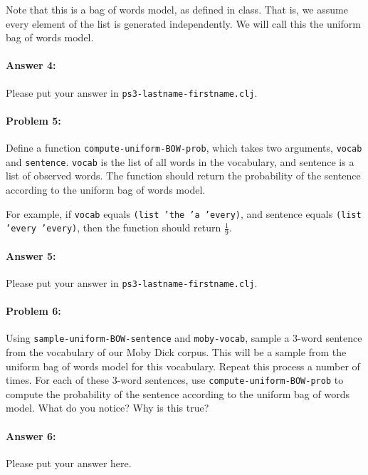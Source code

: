 \documentclass[10pt]{article}
\newcommand{\PSnum}{3}
\begin{document}
Note that this is a bag of words model, as defined in class. That is,
we assume every element of the list is generated independently. We
will call this the uniform bag of words model.

\paragraph{Answer 4:} Please put your answer in
\texttt{ps\PSnum-lastname-firstname.clj}.

\noindent\hrulefill %

\paragraph{Problem 5:}

Define a function \texttt{compute-uniform-BOW-prob}, which takes two
arguments, \texttt{vocab} and \texttt{sentence}. \texttt{vocab} is the
list of all words in the vocabulary, and sentence is a list of
observed words. The function should return the probability of the
sentence according to the uniform bag of words model.

For example, if \texttt{vocab} equals \texttt{(list 'the 'a 'every)},
and sentence equals \texttt{(list 'every 'every)}, then the function
should return $\frac{1}{9}$.

\paragraph{Answer 5:} Please put your answer in
\texttt{ps\PSnum-lastname-firstname.clj}.

\noindent\hrulefill %

\paragraph{Problem 6:}

Using \texttt{sample-uniform-BOW-sentence} and \texttt{moby-vocab},
sample a 3-word sentence from the vocabulary of our Moby Dick
corpus. This will be a sample from the uniform bag of words model for
this vocabulary. Repeat this process a number of times. For each of
these 3-word sentences, use \texttt{compute-uniform-BOW-prob} to
compute the probability of the sentence according to the uniform bag
of words model. What do you notice? Why is this true?

\paragraph{Answer 6:} Please put your answer here.
\end{document}

